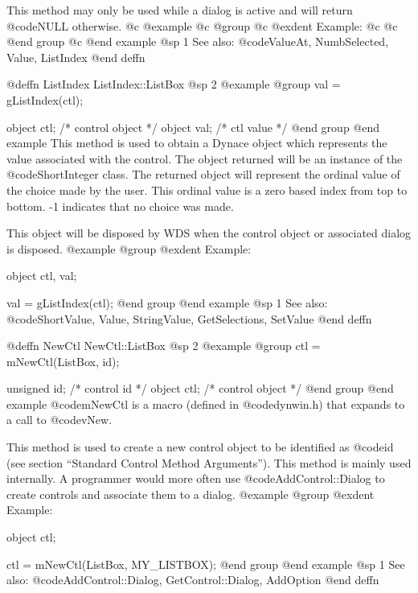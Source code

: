 {This method may only be used while a dialog is active and will return
@code{NULL} otherwise.
@c @example
@c @group
@c @exdent Example:
@c 
@c @end group
@c @end example
@sp 1
See also:  @code{ValueAt, NumbSelected, Value, ListIndex}
@end deffn
















@deffn {ListIndex} ListIndex::ListBox
@sp 2
@example
@group
val = gListIndex(ctl);

object  ctl;   /*  control object  */
object  val;   /*  ctl value       */
@end group
@end example
This method is used to obtain a Dynace object which represents the value
associated with the control.  The object returned will be an instance of
the @code{ShortInteger} class.  The returned object will represent the
ordinal value of the choice made by the user.  This ordinal value is a
zero based index from top to bottom.  -1 indicates that no choice was
made.

This object will be disposed by WDS when the control object or
associated dialog is disposed.
@example
@group
@exdent Example:

object  ctl, val;

val = gListIndex(ctl);
@end group
@end example
@sp 1
See also:  @code{ShortValue, Value, StringValue, GetSelections, SetValue}
@end deffn




@deffn {NewCtl} NewCtl::ListBox
@sp 2
@example
@group
ctl = mNewCtl(ListBox, id);

unsigned  id;   /*  control id      */
object   ctl;   /*  control object  */
@end group
@end example
@code{mNewCtl} is a macro (defined in @code{dynwin.h}) that expands to
a call to @code{vNew}.

This method is used to create a new control object to be identified as
@code{id} (see section ``Standard Control Method Arguments'').  This
method is mainly used internally.  A programmer would more often
use @code{AddControl::Dialog} to create controls and associate them
to a dialog.
@example
@group
@exdent Example:

object  ctl;

ctl = mNewCtl(ListBox, MY_LISTBOX);
@end group
@end example
@sp 1
See also:  @code{AddControl::Dialog, GetControl::Dialog, AddOption}
@end deffn











}
